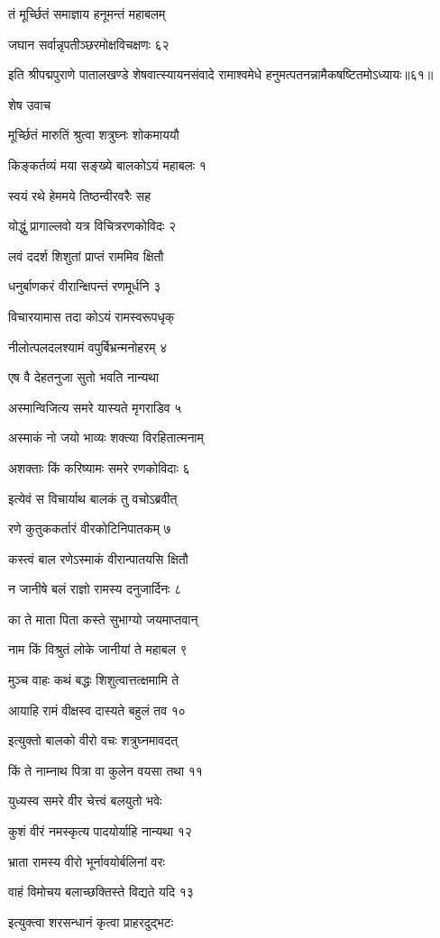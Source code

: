 तं मूर्च्छितं समाज्ञाय हनूमन्तं महाबलम्

जघान सर्वान्नृपतीञ्छरमोक्षविचक्षणः ६२

इति श्रीपद्मपुराणे पातालखण्डे शेषवात्स्यायनसंवादे रामाश्वमेधे हनुमत्पतनन्नामैकषष्टितमोऽध्यायः॥६१॥


शेष उवाच

मूर्च्छितं मारुतिं श्रुत्वा शत्रुघ्नः शोकमाययौ

किङ्कर्तव्यं मया सङ्ख्ये बालकोऽयं महाबलः १

स्वयं रथे हेममये तिष्ठन्वीरवरैः सह

योद्धुं प्रागाल्लवो यत्र विचित्ररणकोविदः २

लवं ददर्श शिशुतां प्राप्तं राममिव क्षितौ

धनुर्बाणकरं वीरान्क्षिपन्तं रणमूर्धनि ३

विचारयामास तदा कोऽयं रामस्वरूपधृक्

नीलोत्पलदलश्यामं वपुर्बिभ्रन्मनोहरम् ४

एष वै देहतनुजा सुतो भवति नान्यथा

अस्मान्विजित्य समरे यास्यते मृगराडिव ५

अस्माकं नो जयो भाव्यः शक्त्या विरहितात्मनाम्

अशक्ताः किं करिष्यामः समरे रणकोविदाः ६

इत्येवं स विचार्याथ बालकं तु वचोऽब्रवीत्

रणे कुतुककर्तारं वीरकोटिनिपातकम् ७

कस्त्वं बाल रणेऽस्माकं वीरान्पातयसि क्षितौ

न जानीषे बलं राज्ञो रामस्य दनुजार्दिनः ८

का ते माता पिता कस्ते सुभाग्यो जयमाप्तवान्

नाम किं विश्रुतं लोके जानीयां ते महाबल ९

मुञ्च वाहः कथं बद्धः शिशुत्वात्तत्क्षमामि ते

आयाहि रामं वीक्षस्व दास्यते बहुलं तव १०

इत्युक्तो बालको वीरो वचः शत्रुघ्नमावदत्

किं ते नाम्नाथ पित्रा वा कुलेन वयसा तथा ११

युध्यस्व समरे वीर चेत्त्वं बलयुतो भवेः

कुशं वीरं नमस्कृत्य पादयोर्याहि नान्यथा १२

भ्राता रामस्य वीरो भूर्नावयोर्बलिनां वरः

वाहं विमोचय बलाच्छक्तिस्ते विद्यते यदि १३

इत्युक्त्वा शरसन्धानं कृत्वा प्राहरदुद्भटः

